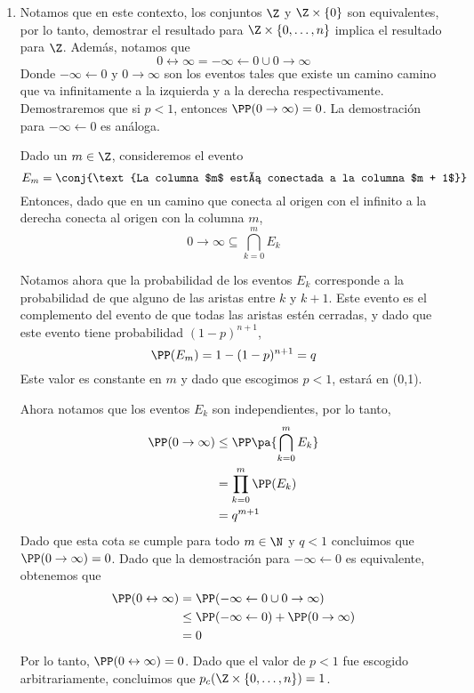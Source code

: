 \begin{solucion}

\begin{enumerate}[label=\alph*)]
	\item Notamos que en este contexto, los conjuntos $\Z$ y $\Z\times \{0\}$ son equivalentes, por lo tanto, demostrar el resultado para $\Z\times \{0,\dots,n\}$ implica el resultado para $\Z$. Además, notamos que
		\[
			0 \leftrightarrow \infty = -\infty \leftarrow 0 \cup 0\rightarrow \infty
		\]
		Donde $-\infty \leftarrow 0$ y $0\rightarrow\infty$ son los eventos tales que existe un camino camino que va infinitamente a la izquierda y a la derecha respectivamente. Demostraremos que si $p < 1$, entonces $\PP(0\rightarrow\infty) = 0$. La demostración para $-\infty \leftarrow 0$ es análoga.

	Dado un $m \in \Z$, consideremos el evento
		\[
			E_m = \conj{\text{La columna $m$ está conectada a la columna $m + 1$}}
		\]
	Entonces, dado que en un camino que conecta al origen con el infinito a la derecha conecta al origen con la columna $m$,
		\[
			0\rightarrow \infty\subseteq\bigcap^{m}_{k=0}E_k  
		\]

		Notamos ahora que la probabilidad de los eventos $E_k$ corresponde a la probabilidad de que alguno de las aristas entre $k$ y $k+1$. Este evento es el complemento del evento de que todas las aristas estén cerradas, y dado que este evento tiene probabilidad $(1-p)^{n+1}$,
		\[
			\PP(E_m) = 1-(1-p)^{n+1} = q
		\]
		Este valor es constante en $m$ y dado que escogimos $p<1$, estará en (0,1).

		Ahora notamos que los eventos $E_k$ son independientes, por lo tanto,
		\begin{align*}
			\PP(0\rightarrow \infty) &\leq \PP\pa{\bigcap^{m}_{k=0}E_k} \\
			&=\prod_{k=0}^{m}\PP(E_k) \\
			&= q^{m+1}
		\end{align*}
		Dado que esta cota se cumple para todo $m \in \N$ y $q < 1$ concluimos que $\PP(0\rightarrow\infty) = 0$. Dado que la demostración para $-\infty\leftarrow0$ es equivalente, obtenemos que
		\begin{align*}
			\PP(0 \leftrightarrow \infty) &=\PP( -\infty \leftarrow 0 \cup 0\rightarrow \infty) \\
			&\leq\PP( -\infty \leftarrow 0) + \PP( 0\rightarrow \infty) \\
			&= 0
		\end{align*}
		Por lo tanto, $\PP(0 \leftrightarrow \infty) = 0$. Dado que el valor de $p<1$ fue escogido arbitrariamente, concluimos que $p_c(\Z\times\{0,\dots,n\}) = 1$.


\end{enumerate}
\end{solucion}
